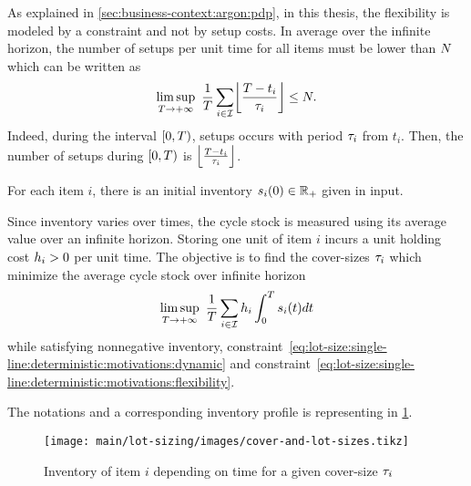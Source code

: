 As explained in \cref{sec:business-context:argon:pdp}, in this thesis, the flexibility is modeled by a constraint and not by setup costs.
In average over the infinite horizon, the number of setups per unit time for all items must be lower than $N$ which can be written as
\begin{equation}\label{eq:lot-size:single-line:deterministic:motivations:flexibility}
  \limsup_{\horizon\rightarrow+\infty}\ \frac{1}{\horizon} \sum_{i\in\REF} \left\lfloor\frac{\horizon-t_i}{\cover_i}\right\rfloor \le \nbsetups.
\end{equation}
Indeed, during the interval $\left[0,\horizon\right)$, setups occurs with period $\tau_i$ from $t_i$.
Then, the number of setups during $\left[0,\horizon\right)$ is $\left\lfloor\frac{\horizon-t_i}{\cover_i}\right\rfloor$.


For each item $i$, there is an initial inventory $\inventory_i\bracket{0}\in\RR_+$ given in input.


Since inventory varies over times, the cycle stock is measured using its average value over an infinite horizon.
Storing one unit of item $i$ incurs a unit holding cost $h_i>0$ per unit time.
The objective is to find the cover-sizes $\tau_i$ which minimize the average cycle stock over infinite horizon
\begin{equation}
  \limsup_{\horizon\rightarrow+\infty}\ \frac{1}{\horizon} \sum_{i\in\REF} \holding_i \int_0^{\horizon}\inventory_i\bracket{t}dt
\end{equation}
while satisfying nonnegative inventory, constraint~\eqref{eq:lot-size:single-line:deterministic:motivations:dynamic} and constraint~\eqref{eq:lot-size:single-line:deterministic:motivations:flexibility}.

The notations and a corresponding inventory profile is representing in \cref{fig:cover-size-item-i}.

\begin{figure}[h]
  \centering
  \texttt{[image: main/lot-sizing/images/cover-and-lot-sizes.tikz]}
  \caption{Inventory of item $i$ depending on time for a given cover-size $\tau_i$}
  \label{fig:cover-size-item-i}
\end{figure}



